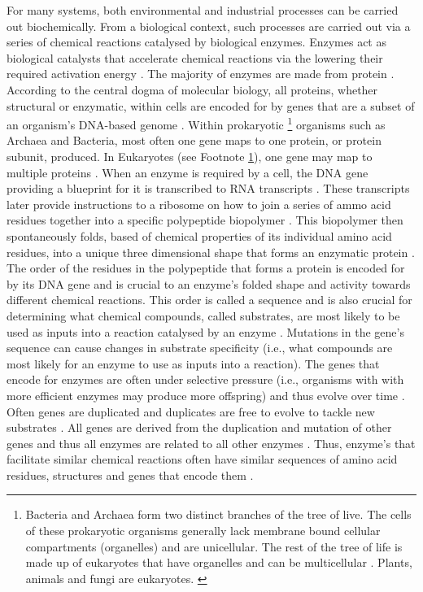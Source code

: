 For many systems, both environmental and industrial processes can be carried out biochemically. From a biological context, such processes are carried out via a series of chemical reactions catalysed by biological enzymes. Enzymes act as biological catalysts that accelerate chemical reactions via the lowering their required activation energy \cite{segel1975enzyme}. The majority of enzymes are made from protein \cite{kruger1982self}. According to the central dogma of molecular biology, all proteins, whether structural or enzymatic, within cells are encoded for by genes that are a subset of an organism's DNA-based genome \cite{crick1970central}. Within prokaryotic \footnote{Bacteria and Archaea form two distinct branches of the tree of live. The cells of these prokaryotic organisms generally \cite{nevo2007thylakoid,cameron2013biogenesis,bazylinski2004magnetosome,van2008combined,adams2000heterocyst,o2000biofilm} lack membrane bound cellular compartments (organelles) and are unicellular. The rest of the tree of life is made up of eukaryotes that have organelles and can be multicellular \cite{baldauf2003deep}. Plants, animals and fungi are eukaryotes. \label{types-of-cells}} organisms such as Archaea and Bacteria, most often one gene maps to one protein, or protein subunit, produced. In Eukaryotes (see Footnote \ref{types-of-cells}), one gene may map to multiple proteins \cite{black2003mechanisms}. When an enzyme is required by a cell, the DNA gene providing a blueprint for it is transcribed to RNA transcripts \cite{crick1970central}. These transcripts later provide instructions to a ribosome on how to join a series of ammo acid residues together into a specific polypeptide biopolymer \cite{crick1970central}. This biopolymer then spontaneously folds, based of chemical properties of its individual amino acid residues, into a unique three dimensional shape that forms an enzymatic protein \cite{fersht1992folding}. The order of the residues in the polypeptide that forms a protein is encoded for by its DNA gene and is crucial to an enzyme's folded shape and activity towards different chemical reactions. This order is called a sequence and is also crucial for determining what chemical compounds, called substrates, are most likely to be used as inputs into a reaction catalysed by an enzyme \cite{fersht1992folding,fersht1999structure}. Mutations in the gene's sequence can cause changes in substrate specificity (i.e., what compounds are most likely for an enzyme to use as inputs into a reaction). The genes that encode for enzymes are often under selective pressure (i.e., organisms with with more efficient enzymes may produce more offspring) and thus evolve over time \cite{zhang2003evolution,whelan2001general}. Often genes are duplicated and duplicates are free to evolve to tackle new substrates \cite{zhang2003evolution}. All genes are derived from the duplication and mutation of other genes and thus all enzymes are related to all other enzymes \cite{zhang2003evolution,whelan2001general}. Thus, enzyme's that facilitate similar chemical reactions often \cite{galperin1998analogous} have similar sequences of amino acid residues, structures and genes that encode them \cite{zhang2003evolution}.

